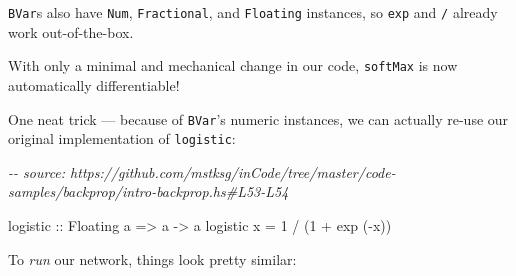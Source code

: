 \documentclass[]{article}
\newenvironment{Shaded}{}{}
\newcommand{\CommentTok}[1]{\textcolor[rgb]{0.38,0.63,0.69}{\textit{#1}}}
\newcommand{\DataTypeTok}[1]{\textcolor[rgb]{0.56,0.13,0.00}{#1}}
\newcommand{\DecValTok}[1]{\textcolor[rgb]{0.25,0.63,0.44}{#1}}
\newcommand{\FunctionTok}[1]{\textcolor[rgb]{0.02,0.16,0.49}{#1}}
\newcommand{\KeywordTok}[1]{\textcolor[rgb]{0.00,0.44,0.13}{\textbf{#1}}}
\newcommand{\NormalTok}[1]{#1}
\newcommand{\OperatorTok}[1]{\textcolor[rgb]{0.40,0.40,0.40}{#1}}
\newcommand{\OtherTok}[1]{\textcolor[rgb]{0.00,0.44,0.13}{#1}}
\begin{document}
\texttt{BVar}s also have \texttt{Num}, \texttt{Fractional}, and
\texttt{Floating} instances, so \texttt{exp} and \texttt{/} already work
out-of-the-box.

With only a minimal and mechanical change in our code, \texttt{softMax} is now
automatically differentiable!

One neat trick --- because of \texttt{BVar}'s numeric instances, we can actually
re-use our original implementation of \texttt{logistic}:

\begin{Shaded}
\begin{Highlighting}[]
\CommentTok{{-}{-} source: https://github.com/mstksg/inCode/tree/master/code{-}samples/backprop/intro{-}backprop.hs\#L53{-}L54}

\OtherTok{logistic ::} \DataTypeTok{Floating}\NormalTok{ a }\OtherTok{=\textgreater{}}\NormalTok{ a }\OtherTok{{-}\textgreater{}}\NormalTok{ a}
\NormalTok{logistic x }\OtherTok{=} \DecValTok{1} \OperatorTok{/}\NormalTok{ (}\DecValTok{1} \OperatorTok{+} \FunctionTok{exp}\NormalTok{ (}\OperatorTok{{-}}\NormalTok{x))}
\end{Highlighting}
\end{Shaded}

To \emph{run} our network, things look pretty similar:

\begin{Shaded}
\end{Shaded}
\end{document}
